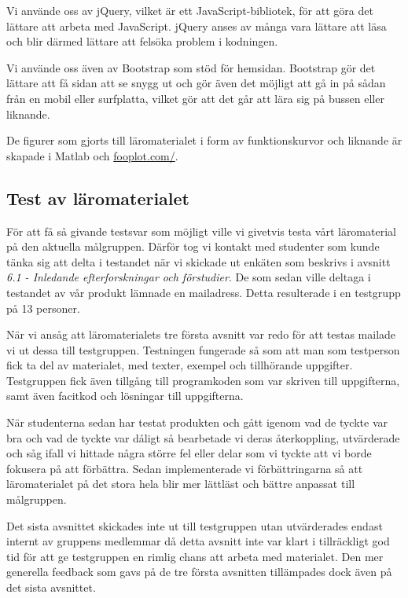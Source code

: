 \documentclass[]{article}
\begin{document}
Vi använde oss av jQuery, vilket är ett JavaScript-bibliotek, för att
göra det lättare att arbeta med JavaScript. jQuery anses av många vara
lättare att läsa och blir därmed lättare att felsöka problem i
kodningen.

Vi använde oss även av Bootstrap som stöd för hemsidan. Bootstrap gör
det lättare att få sidan att se snygg ut och gör även det möjligt att
gå in på sådan från en mobil eller surfplatta, vilket gör att det går
att lära sig på bussen eller liknande.

De figurer som gjorts till läromaterialet i form av funktionskurvor
och liknande är skapade i Matlab och \url{fooplot.com/}.

\subsection{Test av läromaterialet}

För att få så givande testsvar som möjligt ville vi givetvis testa
vårt läromaterial på den aktuella målgruppen. Därför tog vi kontakt
med studenter som kunde tänka sig att delta i testandet när vi
skickade ut enkäten som beskrivs i avsnitt \textit{6.1 - 
Inledande efterforskningar och förstudier}. De som
sedan ville deltaga i testandet av vår produkt lämnade en
mailadress. Detta resulterade i en testgrupp på 13 personer.

När vi ansåg att läromaterialets tre första avsnitt var redo för att
testas mailade vi ut dessa till testgruppen. Testningen fungerade så
som att man som testperson fick ta del av materialet, med texter,
exempel och tillhörande uppgifter. Testgruppen fick även tillgång till
programkoden som var skriven till uppgifterna, samt även facitkod och
lösningar till uppgifterna.

När studenterna sedan har testat produkten och gått igenom vad de
tyckte var bra och vad de tyckte var dåligt så bearbetade vi deras
återkoppling, utvärderade och såg ifall vi hittade några större fel
eller delar som vi tyckte att vi borde fokusera på att
förbättra. Sedan implementerade vi förbättringarna så att
läromaterialet på det stora hela blir mer lättläst och bättre anpassat
till målgruppen.

Det sista avsnittet skickades inte ut till testgruppen utan
utvärderades endast internt av gruppens medlemmar då detta avsnitt
inte var klart i tillräckligt god tid för att ge testgruppen en rimlig
chans att arbeta med materialet. Den mer generella feedback som gavs
på de tre första avsnitten tillämpades dock även på det sista
avsnittet.
\end{document}
